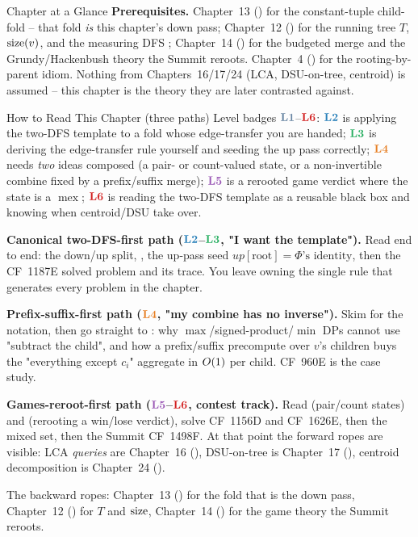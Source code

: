 \begin{chaptertheorybox}{Chapter at a Glance}
\textbf{Prerequisites.} Chapter~13 () for the constant-tuple
child-fold  -- that fold \emph{is} this chapter's
down pass; Chapter~12 () for the running tree $T$, $\operatorname{size}(v)$, and
the measuring DFS ; Chapter~14 () for the
budgeted merge  and the Grundy/Hackenbush theory
 the Summit reroots. Chapter~4 () for the
rooting-by-parent idiom. Nothing from Chapters~16/17/24 (LCA, DSU-on-tree,
centroid) is assumed -- this chapter is the theory they are later contrasted
against.
\end{chaptertheorybox}

\begin{chaptertheorybox}{How to Read This Chapter (three paths)}
Level badges $\lv1$--$\lv6$: $\lv2$ is applying the two-DFS template to a
fold whose edge-transfer you are handed; $\lv3$ is deriving the edge-transfer
rule yourself and seeding the up pass correctly; $\lv4$ needs \emph{two} ideas
composed (a pair- or count-valued state, or a non-invertible combine fixed by
a prefix/suffix merge); $\lv5$ is a rerooted game verdict where the state is a
$\operatorname{mex}$; $\lv6$ is reading the two-DFS template as a reusable
black box and knowing when centroid/DSU take over.

\textbf{Canonical two-DFS-first path ($\lv2$--$\lv{3}$, "I want the template").}
Read  end to end: the down/up split, ,
the up-pass seed $\mathit{up}[\text{root}]=\Phi\text{'s identity}$, then the
CF~1187E solved problem and its trace.  You leave owning the single rule that
generates every problem in the chapter.

\textbf{Prefix-suffix-first path ($\lv4$, "my combine has no inverse").}
Skim  for the notation, then go straight to
: why $\max$/signed-product/$\min$ DPs cannot use
"subtract the child", and how a prefix/suffix precompute over $v$'s children
buys the "everything except $c_i$" aggregate in $O(1)$ per child.  CF~960E
is the case study.

\textbf{Games-reroot-first path ($\lv5$--$\lv6$, contest track).}  Read
 (pair/count states) and  (rerooting
a win/lose verdict), solve CF~1156D and CF~1626E, then the mixed set, then the
Summit CF~1498F.  At that point the forward ropes are visible: LCA \emph{queries}
are Chapter~16 (), DSU-on-tree is Chapter~17 (), centroid
decomposition is Chapter~24 ().

The backward ropes: Chapter~13 () for the fold that is the down
pass, Chapter~12 () for $T$ and $\operatorname{size}$, Chapter~14 ()
for the game theory the Summit reroots.
\end{chaptertheorybox}

